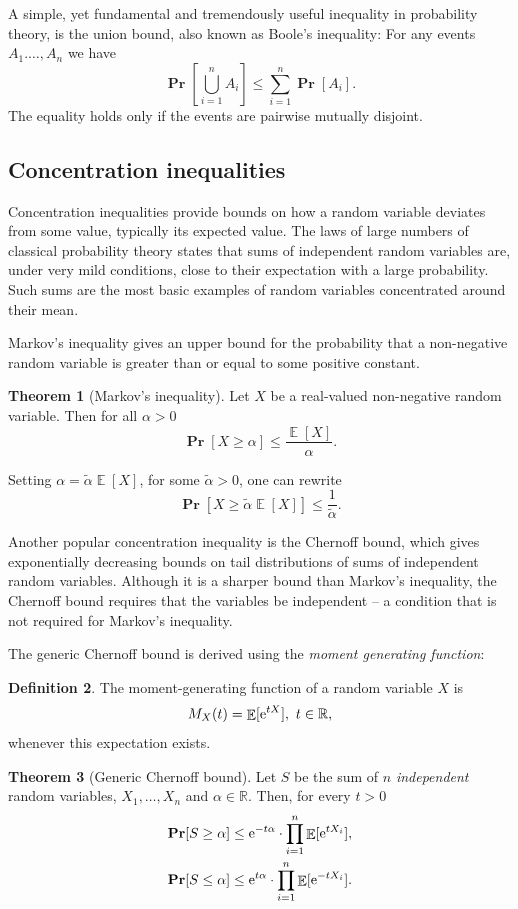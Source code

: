 \documentclass[10pt,a4paper,twoside]{book}
\newcommand{\ex}{{\rm e}}
\DeclareMathOperator*{\prob}{\mathbf{Pr}}
\DeclareMathOperator*{\EE}{\mathbb{E}}
\theoremstyle{definition}
\newtheorem{definition}{Definition}[chapter]
\newtheorem{theorem}[definition]{Theorem}
\theoremstyle{remark}
\begin{document}
Α simple, yet fundamental and tremendously useful inequality in probability theory, is the union bound, also known as Boole's inequality: For any events $A_1. \ldots, A_n$ we have
\[ \prob \left[ \bigcup_{i=1}^n A_i \right] \leq \sum_{i=1}^n \prob[A_i]. \]
The equality holds only if the events are pairwise mutually disjoint.

\subsection*{Concentration inequalities} 
Concentration inequalities provide bounds on how a random variable deviates from some value, typically its expected value. The laws of large numbers of classical probability theory states that sums of independent random variables are, under very mild conditions, close to their expectation with a large probability. Such sums are the most basic examples of random variables concentrated around their mean.

Markov's inequality gives an upper bound for the probability that a non-negative random variable is greater than or equal to some positive constant.  
\begin{theorem}[Markov's inequality]
Let $X$ be a real-valued non-negative random variable. Then for all $\alpha >0$
\begin{equation*}
    \prob[X \geq \alpha] \leq \frac{\EE[X]}{\alpha}.
\end{equation*} 
\end{theorem}
Setting $\alpha = \tilde{\alpha} \EE[X]$, for some $\tilde{\alpha} > 0$, one can rewrite
\[ \prob[X \geq \tilde{\alpha} \EE[X]] \leq \frac{1}{\tilde{\alpha}}. \]

Another popular concentration inequality is the Chernoff bound, which gives exponentially decreasing bounds on tail distributions of sums of independent random variables. Although it is a sharper bound than Markov's inequality, the Chernoff bound requires that the variables be independent – a condition that is not required for Markov's inequality.

The generic Chernoff bound is derived using the \textit{moment generating function}:
\begin{definition}
The moment-generating function of a random variable $X$ is
\[M_X(t) = \EE[\ex^{tX}], \ t \in \mathbb{R}, \]
whenever this expectation exists.
\end{definition}

\begin{theorem} [Generic Chernoff bound]
Let $S$ be the sum of $n$ \textit{independent} random variables, $X_1, \ldots, X_n$ and $\alpha \in \mathbb{R}$. Then, for every $t >0$
\begin{align*}
    \prob[S \geq \alpha] &\leq \ex^{-t\alpha} \cdot \prod_{i=1}^n \EE[\ex^{tX_i}], \\
    \prob[S \leq \alpha] &\leq \ex^{t\alpha} \cdot \prod_{i=1}^n \EE[\ex^{-tX_i}].
\end{align*}
\end{theorem}
\end{document}
